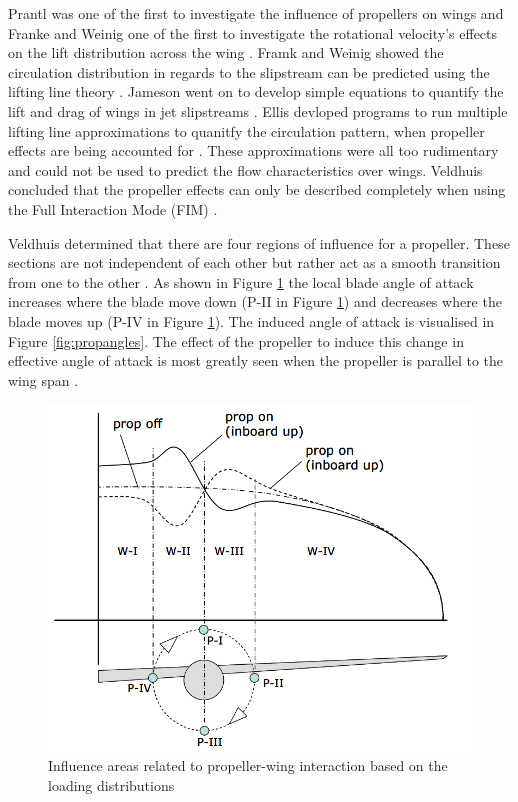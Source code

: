     Prantl was one of the first to investigate the influence of propellers on wings \cite{Prandtl1931} and Franke and Weinig one of the first to investigate the rotational velocity's effects on the lift distribution across the wing \cite{Franke1939}. Framk and Weinig showed the circulation distribution in regards to the slipstream can be predicted using the lifting line theory \cite{Franke1939}. Jameson went on to develop simple equations to quantify the lift and drag of wings in jet slipstreams \cite{Jameson1970}. Ellis devloped programs to run multiple lifting line approximations to quanitfy the circulation pattern, when propeller effects are being accounted for \cite{Ellis1971}. These approximations were all too rudimentary and could not be used to predict the flow characteristics over wings. Veldhuis concluded that the propeller effects can only be described completely when using the Full Interaction Mode (FIM) \cite{Veldhuis2004}. 


Veldhuis determined that there are four regions of influence for a propeller. These sections are not independent of each other but rather act as a smooth transition from one to the other \cite{Veldhuis2004}. As shown in Figure \ref{fig:propfour} the local blade angle of attack increases where the blade move down (P-II in Figure \ref{fig:propfour}) and decreases where the blade moves up (P-IV in Figure \ref{fig:propfour}). The induced angle of attack is visualised in Figure \ref{fig:propangles}. The effect of the propeller to induce this change in effective angle of attack is most greatly seen when the propeller is parallel to the wing span \cite{Veldhuis2004}.

\begin{figure}[H]
  \centering
  \includegraphics[width=0.63\linewidth]{03_LiteratureReview/Figs/four.png}
  \caption{Influence areas related to propeller-wing interaction based on the loading distributions \cite{Veldhuis2004}}
  \label{fig:propfour}
\end{figure}

